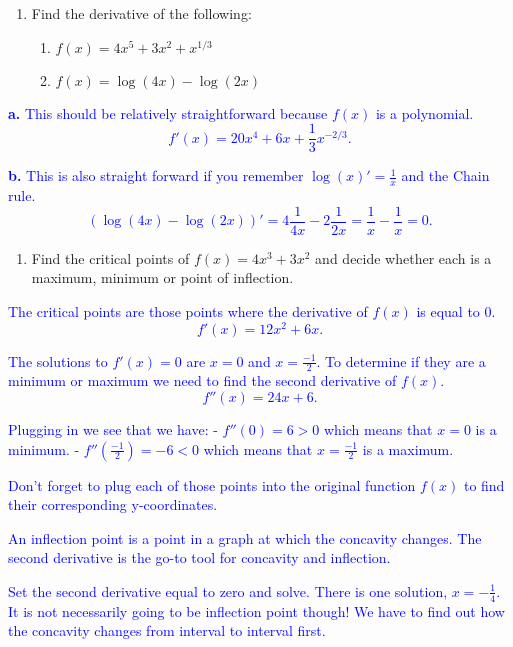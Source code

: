 \documentclass[
]{article}
\providecommand{\tightlist}{%
  \setlength{\itemsep}{0pt}\setlength{\parskip}{0pt}}
\begin{document}
\begin{enumerate}
\def\labelenumi{\arabic{enumi}.}
\item
  Find the derivative of the following:

  \begin{enumerate}
  \def\labelenumii{\alph{enumii}.}
  \tightlist
  \item
    \(f(x) = 4 x^5 + 3 x^2 + x^{1/3}\)
  \item
    \(f(x) = \log(4x) - \log(2x)\)
  \end{enumerate}
\end{enumerate}

\textcolor{blue}{\textbf{a.} This should be relatively straightforward because $f(x)$ is a polynomial.
$$f'(x) = 20 x^4 + 6 x + \frac{1}{3} x^{-2/3}.$$}

\textcolor{blue}{\textbf{b.} This is also straight forward if you remember $\log(x)' = \frac{1}{x}$ and the Chain rule.
$$\left(\log(4x) - \log(2x) \right)' =  4 \frac{1}{4x} - 2 \frac{1}{2x} = \frac{1}{x} - \frac{1}{x} = 0.$$}

\hfill\break

\begin{enumerate}
\def\labelenumi{\arabic{enumi}.}
\setcounter{enumi}{1}
\tightlist
\item
  Find the critical points of \(f(x) = 4 x^3 + 3 x^2\) and decide whether each is a maximum, minimum or point of inflection.
\end{enumerate}

\textcolor{blue}{The critical points are those points where the derivative of $f(x)$ is equal to 0.
$$f'(x) = 12 x^2 + 6x.$$}

\textcolor{blue}{The solutions to $f'(x) = 0$ are $x = 0$ and $x = \frac{-1}{2}$.  To determine if they are a minimum or maximum we need to find the second derivative of $f(x)$.
$$f''(x) = 24 x + 6.$$}

\textcolor{blue}{Plugging in we see that we have:
- $f''(0) = 6 > 0$ which means that $x = 0$ is a minimum.
- $f''\left( \frac{-1}{2} \right) = -6 < 0$ which means that $x = \frac{-1}{2}$ is a maximum.}

\textcolor{blue}{Don't forget to plug each of those points into the original function $f(x)$ to find their corresponding y-coordinates.}

\textcolor{blue}{An inflection point is a point in a graph at which the concavity changes. The second derivative is the go-to tool for concavity and inflection.}

\textcolor{blue}{Set the second derivative equal to zero and solve. There is one solution, $x=-\frac{1}{4}$. It is not necessarily going to be inflection point though! We have to find out how the concavity changes from interval to interval first.}
\end{document}
